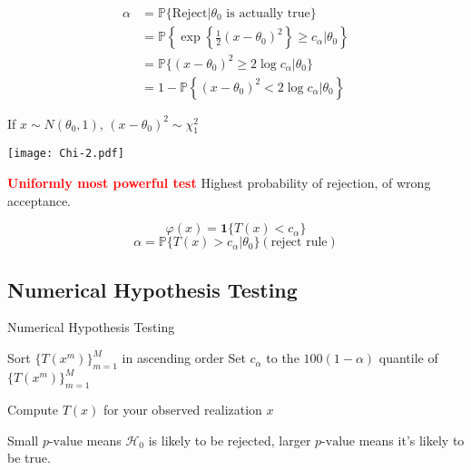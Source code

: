 \begin{align*}
  \alpha & = \mathbb{P} \{ \text{Reject} | \theta_0 \text{ is}
  \text{ actually true} \}\\
  & = \mathbb{P} \left\{ \exp \left\{ \frac{1}{2} (x - \theta_0)^2 \right\}
  \geq c_{\alpha} | \theta_0 \right\}\\
  & = \mathbb{P} \{ (x - \theta_0)^2 \geq 2 \log c_{\alpha} |
  \theta_0 \}\\
  & = 1 - \mathbb{P} \left\{ (x - \theta_0)^2 <
  2 \log c_{\alpha} | \theta_0 \right\}
\end{align*}

If $x \sim N (\theta_0, 1)$, $(x - \theta_0)^2 \sim \chi_{1}^2$

\texttt{[image: Chi-2.pdf]}

\begin{note}
  \textbf{\textcolor{red}{Uniformly most powerful test}} Highest probability
  of rejection, of wrong acceptance.
\end{note}

\[ \varphi (x) = \mathbf{1} \{ T (x) < c_{\alpha} \} \]
\[ \alpha = \mathbb{P} \{ T (x) > c_{\alpha} | \theta_0 \} 
   (\text{reject rule}) \]

\subsection{Numerical Hypothesis Testing}

\begin{algorithm}[H]
  \caption{Numerical Hypothesis Testing}
  \SetAlgoLined
  
  
  
  Sort $\{T(x^m)\}_{m=1}^M$ in ascending order\;
  Set $c_\alpha$ to the $100(1 - \alpha)$ quantile of $\{T(x^m)\}_{m=1}^M$\;
  
  Compute $T(x)$ for your observed realization $x$\;
\end{algorithm}

Small $p\text{-value}$ means $\mathcal{H}_0$ is likely to be rejected,
larger $p\text{-value}$ means it's likely to be true.

